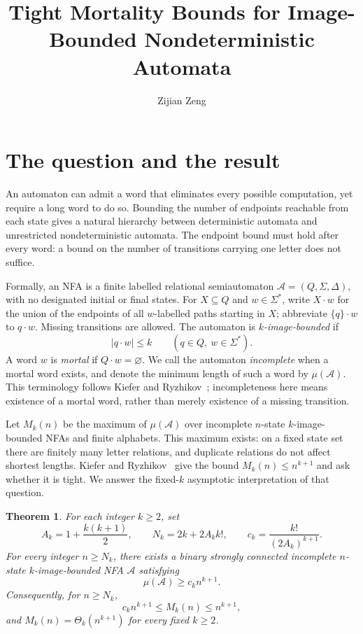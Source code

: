 \documentclass[acmsmall,screen,nonacm,11pt]{acmart}
\title{Tight Mortality Bounds for Image-Bounded Nondeterministic Automata}
\author{Zijian Zeng}
\affiliation{\institution{UCSI University}\city{}\country{Malaysia}}
\newtheorem{theorem}{Theorem}
\newcommand{\emp}{\varnothing}
\newcommand{\calA}{\mathcal{A}}
\begin{document}
\maketitle
\thispagestyle{plain}
\clearpage

\section{The question and the result}

An automaton can admit a word that eliminates every possible computation,
yet require a long word to do so. Bounding the number of endpoints reachable
from each state gives a natural hierarchy between deterministic automata
and unrestricted nondeterministic automata. The endpoint bound must hold
after every word: a bound on the number of transitions carrying one letter
does not suffice.

Formally, an NFA is a finite labelled relational semiautomaton
$\calA=(Q,\Sigma,\Delta)$, with no designated initial or final states.
For $X\subseteq Q$ and $w\in\Sigma^*$, write $X\cdot w$ for the union of
the endpoints of all $w$-labelled paths starting in $X$; abbreviate
$\{q\}\cdot w$ to $q\cdot w$. Missing transitions are allowed.
The automaton is \emph{$k$-image-bounded} if
\begin{equation}\label{eq:global}
 |q\cdot w|\leq k\qquad(q\in Q,\ w\in\Sigma^*).
\end{equation}
A word $w$ is \emph{mortal} if $Q\cdot w=\emp$. We call the automaton
\emph{incomplete} when a mortal word exists, and denote the minimum length
of such a word by $\mu(\calA)$. This terminology follows
Kiefer and Ryzhikov~\cite{KR2025}; incompleteness here means existence of a
mortal word, rather than merely existence of a missing transition.

Let $M_k(n)$ be the maximum of $\mu(\calA)$ over incomplete $n$-state
$k$-image-bounded NFAs and finite alphabets. This maximum exists: on a fixed
state set there are finitely many letter relations, and duplicate relations
do not affect shortest lengths. Kiefer and Ryzhikov~\cite[Section~9]{KR2025}
give the bound $M_k(n)\leq n^{k+1}$ and ask whether it is tight.
We answer the fixed-$k$ asymptotic interpretation of that question.

\begin{theorem}\label{thm:main}
For each integer $k\geq2$, set
\[
 A_k=1+\frac{k(k+1)}2,\qquad
 N_k=2k+2A_k k!,\qquad
 c_k=\frac{k!}{(2A_k)^{k+1}}.
\]
For every integer $n\geq N_k$, there exists a binary strongly connected
incomplete $n$-state $k$-image-bounded NFA $\calA$ satisfying
\[
 \mu(\calA)\geq c_k n^{k+1}.
\]
Consequently, for $n\geq N_k$,
\[
 c_k n^{k+1}\leq M_k(n)\leq n^{k+1},
\]
and $M_k(n)=\Theta_k(n^{k+1})$ for every fixed $k\geq2$.
\end{theorem}
\end{document}
